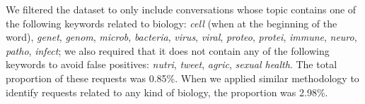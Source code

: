 \documentclass{article}
\theoremstyle{plain}
\theoremstyle{definition}
\theoremstyle{remark}
\begin{document}
We filtered the dataset to only include conversations whose topic contains one of the following keywords related to biology: \emph{cell} (when at the beginning of the word), \emph{genet}, \emph{genom}, \emph{microb}, \emph{bacteria}, \emph{virus}, \emph{viral}, \emph{proteo}, \emph{protei}, \emph{immune}, \emph{neuro}, \emph{patho}, \emph{infect}; we also required that it does not contain any of the following keywords to avoid false positives: \emph{nutri}, \emph{tweet}, \emph{agric}, \emph{sexual health}.
The total proportion of these requests was 0.85\%.
When we applied similar methodology to identify requests related to any kind of biology, the proportion was 2.98\%.
\end{document}
